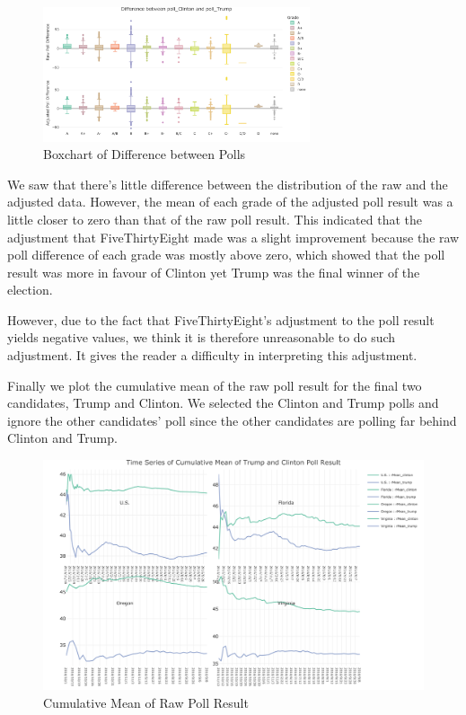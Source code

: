 \documentclass[
  12pt,
]{article}
\begin{document}
\begin{figure}
\centering
\includegraphics[width=0.7\textwidth,height=\textheight]{./Figures/boxchart.png}
\caption{Boxchart of Difference between Polls}
\end{figure}

We saw that there's little difference between the distribution of the
raw and the adjusted data. However, the mean of each grade of the
adjusted poll result was a little closer to zero than that of the raw
poll result. This indicated that the adjustment that FiveThirtyEight
made was a slight improvement because the raw poll difference of each
grade was mostly above zero, which showed that the poll result was more
in favour of Clinton yet Trump was the final winner of the election.

However, due to the fact that FiveThirtyEight's adjustment to the poll
result yields negative values, we think it is therefore unreasonable to
do such adjustment. It gives the reader a difficulty in interpreting
this adjustment.

Finally we plot the cumulative mean of the raw poll result for the final
two candidates, Trump and Clinton. We selected the Clinton and Trump
polls and ignore the other candidates' poll since the other candidates
are polling far behind Clinton and Trump.

\begin{figure}
\centering
\includegraphics{./Figures/cMeanchart.png}
\caption{Cumulative Mean of Raw Poll Result}
\end{figure}
\end{document}
